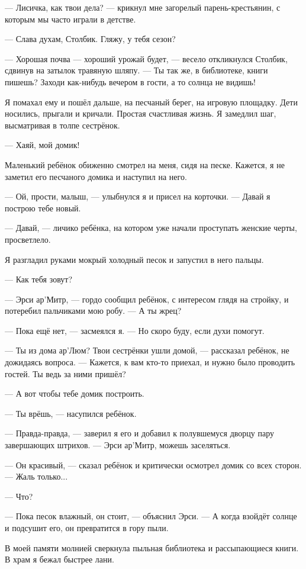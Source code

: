 --- Лисичка, как твои дела? --- крикнул мне загорелый парень-крестьянин, с которым мы часто играли в детстве.

--- Слава духам, Столбик.
Гляжу, у тебя сезон?

--- Хорошая почва --- хороший урожай будет, --- весело откликнулся Столбик, сдвинув на затылок травяную шляпу.
--- Ты так же, в библиотеке, книги пишешь?
Заходи как-нибудь вечером в гости, а то солнца не видишь!

Я помахал ему и пошёл дальше, на песчаный берег, на игровую площадку.
Дети носились, прыгали и кричали.
Простая счастливая жизнь.
Я замедлил шаг, высматривая в толпе сестрёнок.

--- Хаяй, мой домик!

Маленький ребёнок обиженно смотрел на меня, сидя на песке.
Кажется, я не заметил его песчаного домика и наступил на него.

--- Ой, прости, малыш, --- улыбнулся я и присел на корточки.
--- Давай я построю тебе новый.

--- Давай, --- личико ребёнка, на котором уже начали проступать женские черты, просветлело.

Я разгладил руками мокрый холодный песок и запустил в него пальцы.

--- Как тебя зовут?

--- Эрси ар’Митр, --- гордо сообщил ребёнок, с интересом глядя на стройку, и потеребил пальчиками мою робу.
--- А ты жрец?

--- Пока ещё нет, --- засмеялся я.
--- Но скоро буду, если духи помогут.

--- Ты из дома ар’Люм?
Твои сестрёнки ушли домой, --- рассказал ребёнок, не дожидаясь вопроса.
--- Кажется, к вам кто-то приехал, и нужно было проводить гостей.
Ты ведь за ними пришёл?

--- А вот чтобы тебе домик построить.

--- Ты врёшь, --- насупился ребёнок.

--- Правда-правда, --- заверил я его и добавил к полувшемуся дворцу пару завершающих штрихов.
--- Эрси ар’Митр, можешь заселяться.

--- Он красивый, --- сказал ребёнок и критически осмотрел домик со всех сторон.
--- Жаль только...

--- Что?

--- Пока песок влажный, он стоит, --- объяснил Эрси.
--- А когда взойдёт солнце и подсушит его, он превратится в гору пыли.

В моей памяти молнией сверкнула пыльная библиотека и рассыпающиеся книги.
В храм я бежал быстрее лани.

